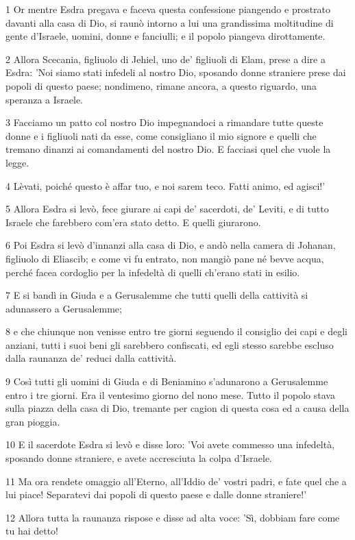 \par 1 Or mentre Esdra pregava e faceva questa confessione piangendo e prostrato davanti alla casa di Dio, si raunò intorno a lui una grandissima moltitudine di gente d'Israele, uomini, donne e fanciulli; e il popolo piangeva dirottamente.
\par 2 Allora Scecania, figliuolo di Jehiel, uno de' figliuoli di Elam, prese a dire a Esdra: 'Noi siamo stati infedeli al nostro Dio, sposando donne straniere prese dai popoli di questo paese; nondimeno, rimane ancora, a questo riguardo, una speranza a Israele.
\par 3 Facciamo un patto col nostro Dio impegnandoci a rimandare tutte queste donne e i figliuoli nati da esse, come consigliano il mio signore e quelli che tremano dinanzi ai comandamenti del nostro Dio. E facciasi quel che vuole la legge.
\par 4 Lèvati, poiché questo è affar tuo, e noi sarem teco. Fatti animo, ed agisci!'
\par 5 Allora Esdra si levò, fece giurare ai capi de' sacerdoti, de' Leviti, e di tutto Israele che farebbero com'era stato detto. E quelli giurarono.
\par 6 Poi Esdra si levò d'innanzi alla casa di Dio, e andò nella camera di Johanan, figliuolo di Eliascib; e come vi fu entrato, non mangiò pane né bevve acqua, perché facea cordoglio per la infedeltà di quelli ch'erano stati in esilio.
\par 7 E si bandì in Giuda e a Gerusalemme che tutti quelli della cattività si adunassero a Gerusalemme;
\par 8 e che chiunque non venisse entro tre giorni seguendo il consiglio dei capi e degli anziani, tutti i suoi beni gli sarebbero confiscati, ed egli stesso sarebbe escluso dalla raunanza de' reduci dalla cattività.
\par 9 Così tutti gli uomini di Giuda e di Beniamino s'adunarono a Gerusalemme entro i tre giorni. Era il ventesimo giorno del nono mese. Tutto il popolo stava sulla piazza della casa di Dio, tremante per cagion di questa cosa ed a causa della gran pioggia.
\par 10 E il sacerdote Esdra si levò e disse loro: 'Voi avete commesso una infedeltà, sposando donne straniere, e avete accresciuta la colpa d'Israele.
\par 11 Ma ora rendete omaggio all'Eterno, all'Iddio de' vostri padri, e fate quel che a lui piace! Separatevi dai popoli di questo paese e dalle donne straniere!'
\par 12 Allora tutta la raunanza rispose e disse ad alta voce: 'Sì, dobbiam fare come tu hai detto!
